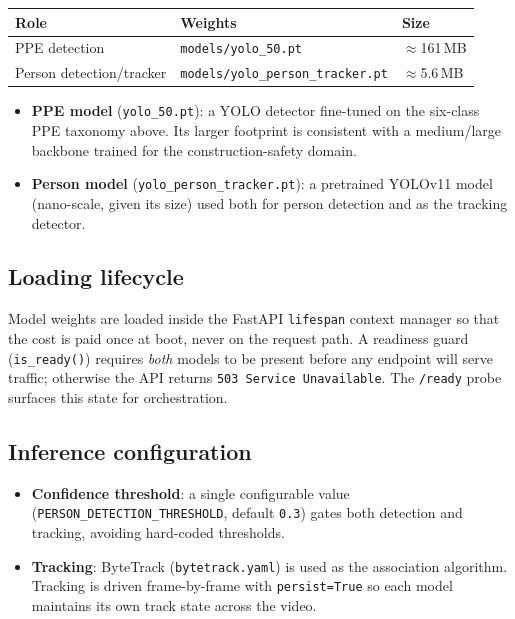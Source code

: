 \documentclass[11pt,a4paper]{article}
\begin{document}
\begin{center}
\begin{tabular}{lll}
\toprule
\textbf{Role} & \textbf{Weights} & \textbf{Size} \\
\midrule
PPE detection            & \verb|models/yolo_50.pt|             & $\approx$161\,MB \\
Person detection/tracker & \verb|models/yolo_person_tracker.pt| & $\approx$5.6\,MB \\
\bottomrule
\end{tabular}
\end{center}

\begin{itemize}
  \item \textbf{PPE model} (\verb|yolo_50.pt|): a YOLO detector fine-tuned on
        the six-class PPE taxonomy above. Its larger footprint is consistent
        with a medium/large backbone trained for the construction-safety
        domain.
  \item \textbf{Person model} (\verb|yolo_person_tracker.pt|): a pretrained
        YOLOv11 model (nano-scale, given its size) used both for person
        detection and as the tracking detector.
\end{itemize}

\subsection{Loading lifecycle}
Model weights are loaded inside the FastAPI \verb|lifespan| context manager so
that the cost is paid once at boot, never on the request path. A readiness
guard (\verb|is_ready()|) requires \emph{both} models to be present before any
endpoint will serve traffic; otherwise the API returns
\verb|503 Service Unavailable|. The \verb|/ready| probe surfaces this state for
orchestration.

\subsection{Inference configuration}
\begin{itemize}
  \item \textbf{Confidence threshold}: a single configurable value
        (\verb|PERSON_DETECTION_THRESHOLD|, default \verb|0.3|) gates both
        detection and tracking, avoiding hard-coded thresholds.
  \item \textbf{Tracking}: ByteTrack (\verb|bytetrack.yaml|) is used as the
        association algorithm. Tracking is driven frame-by-frame with
        \verb|persist=True| so each model maintains its own track state across
        the video.
\end{itemize}
\end{document}
